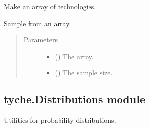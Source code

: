 \documentclass[letterpaper,10pt,english]{sphinxmanual}
\begin{document}
\begin{fulllineitems}

\begin{fulllineitems}
\label{\detokenize{tyche:tyche.Designs.Designs.vectorize_technologies}}
Make an array of technologies.

\end{fulllineitems}


\end{fulllineitems}


\begin{fulllineitems}
\label{\detokenize{tyche:tyche.Designs.sampler}}
Sample from an array.
\begin{quote}\begin{description}
\item[{Parameters}] \leavevmode\begin{itemize}
\item {} 
 () \textendash{} The array.

\item {} 
 () \textendash{} The sample size.

\end{itemize}

\end{description}\end{quote}

\end{fulllineitems}



\subsection{tyche.Distributions module}
\label{\detokenize{tyche:module-tyche.Distributions}}\label{\detokenize{tyche:tyche-distributions-module}}
Utilities for probability distributions.
\end{document}
